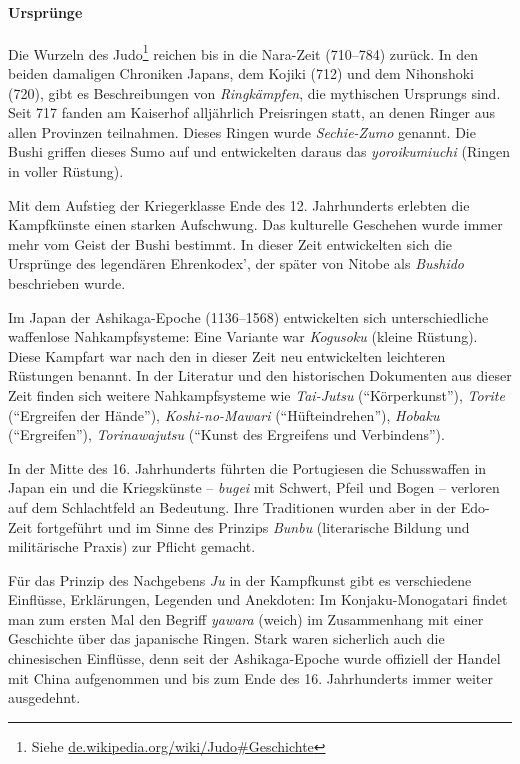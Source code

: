 \documentclass[justified, a4paper, notitlepage, captions=tableheading, nobib]{tufte-handout}
\begin{document}
\paragraph{Ursprünge}
\label{sec:org70bb0fa}
Die Wurzeln des \label{org39a3ee2}Judo\footnote{Siehe \href{https://de.wikipedia.org/wiki/Judo\#Geschichte}{de.wikipedia.org/wiki/Judo\#Geschichte}} reichen bis in die Nara-Zeit (710–784) zurück. In den beiden damaligen Chroniken Japans, dem Kojiki (712) und dem Nihonshoki (720), gibt es Beschreibungen von \emph{Ringkämpfen}, die mythischen Ursprungs sind. Seit 717 fanden am Kaiserhof alljährlich Preisringen statt, an denen Ringer aus allen Provinzen teilnahmen. Dieses Ringen wurde \emph{Sechie-Zumo} genannt. Die Bushi griffen dieses Sumo auf und entwickelten daraus das \emph{yoroikumiuchi} (Ringen in voller Rüstung).

Mit dem Aufstieg der Kriegerklasse Ende des 12. Jahrhunderts erlebten die Kampfkünste einen starken Aufschwung. Das kulturelle Geschehen wurde immer mehr vom Geist der Bushi bestimmt. In dieser Zeit entwickelten sich die Ursprünge des legendären Ehrenkodex', der später von Nitobe als \emph{Bushido} beschrieben wurde.

Im Japan der Ashikaga-Epoche (1136–1568) entwickelten sich unterschiedliche waffenlose Nahkampfsysteme: Eine Variante war \emph{Kogusoku} (kleine Rüstung). Diese Kampfart war nach den in dieser Zeit neu entwickelten leichteren Rüstungen benannt. In der Literatur und den historischen Dokumenten aus dieser Zeit finden sich weitere Nahkampfsysteme wie \emph{Tai-Jutsu} ("`Körperkunst"'), \emph{Torite} ("`Ergreifen der Hände"'), \emph{Koshi-no-Mawari} ("`Hüfteindrehen"'), \emph{Hobaku} ("`Ergreifen"'), \emph{Torinawajutsu} ("`Kunst des Ergreifens und Verbindens"').

In der Mitte des 16. Jahrhunderts führten die Portugiesen die Schusswaffen in Japan ein und die Kriegskünste – \emph{bugei} mit Schwert, Pfeil und Bogen – verloren auf dem Schlachtfeld an Bedeutung. Ihre Traditionen wurden aber in der Edo-Zeit fortgeführt und im Sinne des Prinzips \emph{Bunbu} (literarische Bildung und militärische Praxis) zur Pflicht gemacht.

Für das Prinzip des Nachgebens \emph{Ju} in der Kampfkunst gibt es verschiedene Einflüsse, Erklärungen, Legenden und Anekdoten: Im Konjaku-Monogatari findet man zum ersten Mal den Begriff \emph{yawara} (weich) im Zusammenhang mit einer Geschichte über das japanische Ringen. Stark waren sicherlich auch die chinesischen Einflüsse, denn seit der Ashikaga-Epoche wurde offiziell der Handel mit China aufgenommen und bis zum Ende des 16. Jahrhunderts immer weiter ausgedehnt.
\end{document}
